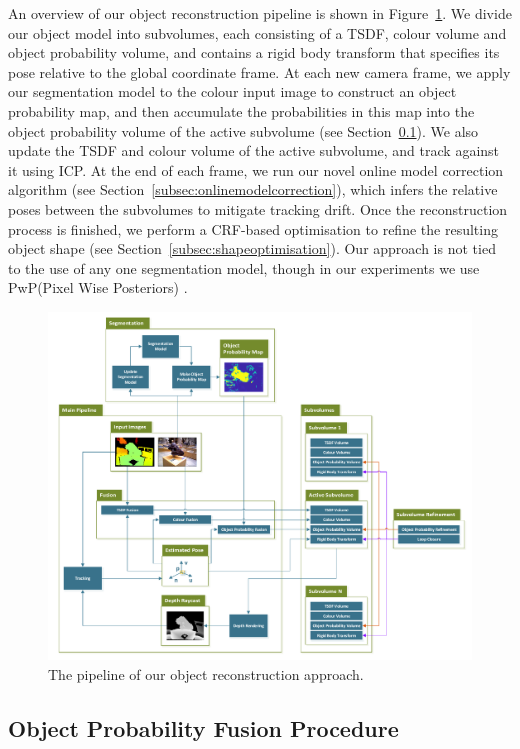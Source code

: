 An overview of our object reconstruction pipeline is shown in Figure~\ref{pipelineDiagram}. We divide our object model into subvolumes, each consisting of a TSDF, 
colour volume and object probability volume, and contains a rigid body transform that specifies its pose relative to the global coordinate frame. At each new camera frame, we apply our segmentation model to the colour input image to construct an object probability map, and then accumulate the probabilities in this map into the object probability volume of the active subvolume (see Section~\ref{subsec:probfusion}). We also update the TSDF and colour volume of the active subvolume, and track against it using ICP. At the end of each frame, we run our novel online model correction algorithm (see Section~\ref{subsec:onlinemodelcorrection}), which infers the relative poses between the subvolumes to mitigate tracking drift. Once the reconstruction process is finished, we perform a CRF-based optimisation to refine the resulting object shape (see Section~\ref{subsec:shapeoptimisation}). Our approach is not tied to the use of any one segmentation model, though in our experiments we use PwP(Pixel Wise Posteriors) \cite{Bibby2008}.

\begin{figure}[!t]
	\centering
	\includegraphics[width=0.7\linewidth]{pipeline.pdf}
	\vspace{-3mm}
	\caption{The pipeline of our object reconstruction approach.}
	\label{pipelineDiagram}
\end{figure}

\subsection{Object Probability Fusion Procedure}
\label{subsec:probfusion}


